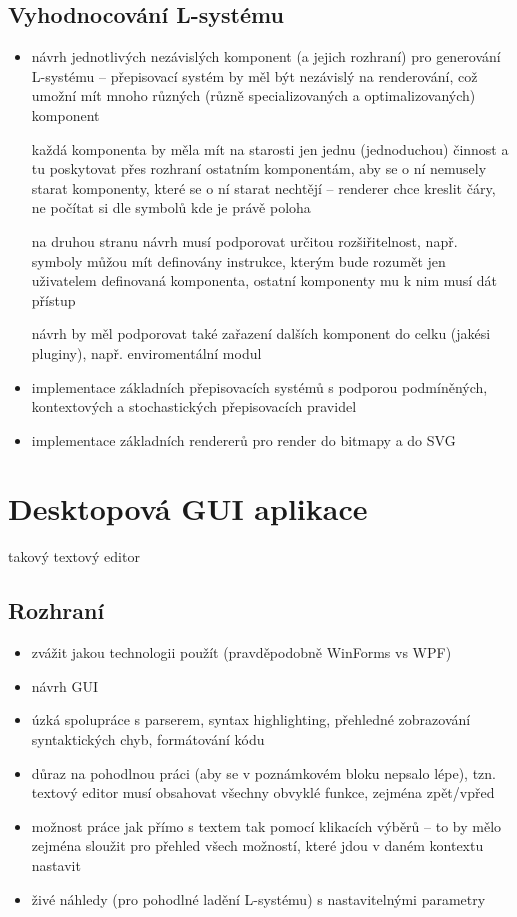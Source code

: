 \documentclass[12pt, a4paper]{article}
\begin{document}
\subsection{Vyhodnocování L-systému}
\begin{itemize}
	\item návrh jednotlivých nezávislých komponent (a jejich rozhraní) pro generování L-systému -- přepisovací systém by měl být nezávislý na renderování, což umožní mít mnoho různých (různě specializovaných a optimalizovaných) komponent

		každá komponenta by měla mít na starosti jen jednu (jednoduchou) činnost a tu poskytovat přes rozhraní ostatním komponentám, aby se o ní nemusely starat komponenty, které se o ní starat nechtějí -- renderer chce kreslit čáry, ne počítat si dle symbolů kde je právě poloha 

		na druhou stranu návrh musí podporovat určitou rozšiřitelnost, např. symboly můžou mít definovány instrukce, kterým bude rozumět jen uživatelem definovaná komponenta, ostatní komponenty mu k nim musí dát přístup

		návrh by měl podporovat také zařazení dalších komponent do celku (jakési pluginy), např. enviromentální modul
	\item implementace základních přepisovacích systémů s podporou podmíněných, kontextových a stochastických přepisovacích pravidel
	\item implementace základních rendererů pro render do bitmapy a do SVG
\end{itemize}


\section{Desktopová GUI aplikace}
takový  textový editor

\subsection{Rozhraní}
\begin{itemize}
	\item zvážit jakou technologii použít (pravděpodobně WinForms vs WPF)
	
	\item návrh GUI
	
	\item úzká spolupráce s parserem, syntax highlighting, přehledné zobrazování syntaktických chyb, formátování kódu
	
	\item důraz na pohodlnou práci (aby se v poznámkovém bloku nepsalo lépe), tzn. textový editor musí obsahovat všechny obvyklé funkce, zejména zpět/vpřed
	
	\item možnost práce jak přímo s textem tak pomocí klikacích výběrů -- to by mělo zejména sloužit pro přehled všech možností, které jdou v daném kontextu nastavit
	
	\item živé náhledy (pro pohodlné ladění L-systému) s nastavitelnými parametry
\end{itemize}
\end{document}
